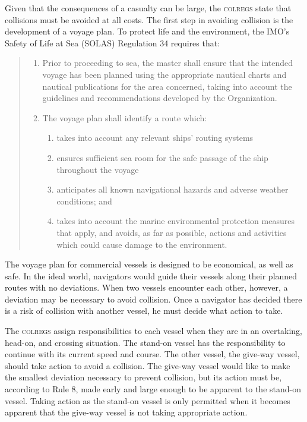 \documentclass[twoside,symmetric,notoc]{tufte-book}
\begin{document}
\par{%
Given that the consequences of a casualty can be large, the \textsc{colregs} state that collisions must be avoided at all costs. The first step in avoiding collision is the development of a voyage plan. To protect life and the environment, the IMO's Safety of Life at Sea (SOLAS) Regulation 34 requires that:\cite{solas}
\vspace{-1ex}
\begin{quotation}
\begin{enumerate}
\item Prior to proceeding to sea, the master shall ensure that the intended voyage has been planned using the appropriate nautical charts and nautical publications for the area concerned, taking into account the guidelines and recommendations developed by the Organization.
\item The voyage plan shall identify a route which:
	\begin{enumerate}
	\item takes into account any relevant ships' routing systems
	\item ensures sufficient sea room for the safe passage of the ship throughout the voyage
	\item anticipates all known navigational hazards and adverse weather conditions; and
	\item takes into account the marine environmental protection measures that apply, and avoids, as far as possible, actions and activities which could cause damage to the environment.
	\end{enumerate}
\end{enumerate}
\end{quotation}
The voyage plan for commercial vessels is designed to be economical, as well as safe. In the ideal world, navigators would guide their vessels along their planned routes with no deviations.\cite{Tsou} When two vessels encounter each other, however, a deviation may be necessary to avoid collision. Once a navigator has decided there is a risk of collision with another vessel, he must decide what action to take.
}
\par{%
The \textsc{colregs} assign responsibilities to each vessel when they are in an overtaking, head-on, and crossing situation. The stand-on vessel has the responsibility to continue with its current speed and course. The other vessel, the give-way vessel, should take action to avoid a collision. The give-way vessel would like to make the smallest deviation necessary to prevent collision, but its action must be, according to Rule 8, made early and large enough to be apparent to the stand-on vessel.\cite{USCG} Taking action as the stand-on vessel is only permitted when it becomes apparent that the give-way vessel is not taking appropriate action.
}
\end{document}
